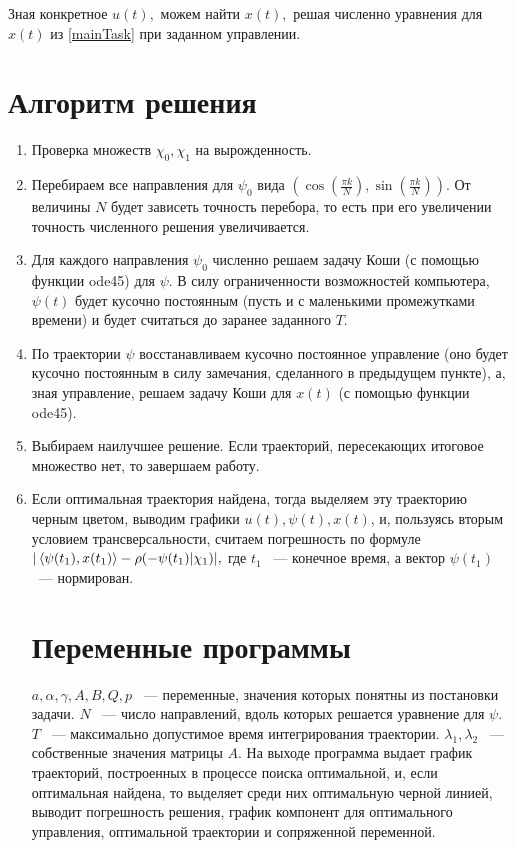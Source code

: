 \documentclass[11pt]{article}
\begin{document}
Зная конкретное $u(t),$ можем найти $x(t),$ решая численно уравнения для $x(t)$ из \eqref{mainTask} при заданном управлении.
\section{Алгоритм решения}
\begin{enumerate}
\item Проверка множеств $\chi_0, \chi_1$ на вырожденность.
\item Перебираем все направления для \(\psi_0\) вида 
\(  \left(\cos\left(\frac{\pi k}{N}\right) , \sin\left(\frac{\pi k}{N}  \right)   \right)  .\) От величины $N$ будет
зависеть точность перебора, то есть при его увеличении точность численного решения увеличивается.
\item Для каждого направления \(\psi_0\) численно решаем задачу Коши (с помощью функции ode45) для $\psi.$
В силу ограниченности возможностей компьютера, $\psi(t)$ будет кусочно постоянным (пусть и с маленькими промежутками времени)
и будет считаться до заранее заданного $T.$
\item По траектории $\psi$ восстанавливаем кусочно постоянное управление (оно будет кусочно постоянным в силу замечания, сделанного в предыдущем пункте), 
а, зная управление, решаем задачу Коши для $x(t)$ (с помощью функции ode45).
\item Выбираем наилучшее решение. Если траекторий, пересекающих итоговое множество нет, то завершаем работу.
\item Если оптимальная траектория найдена, тогда выделяем эту траекторию черным цветом, выводим графики $u(t), \psi(t), x(t)$, и,
 пользуясь вторым условием трансверсальности, считаем погрешность по формуле
$| \left<\psi(t_1),x(t_1)\right> - \rho(-\psi(t_1) | \chi_1) |,$ где $t_1 $ ~--- конечное время, а вектор $\psi(t_1) $ ~--- нормирован.

\section{Переменные программы}
\(a, \alpha, \gamma, A, B, Q, p\) ~--- переменные, значения которых понятны из постановки задачи.
\(N\) ~--- число направлений, вдоль которых решается уравнение для $\psi.$
$T$ ~--- максимально допустимое время интегрирования траектории.
$\lambda_1, \lambda_2$ ~--- собственные значения матрицы $A.$
На выходе программа выдает график траекторий, построенных в процессе поиска оптимальной, и, 
если оптимальная найдена, то выделяет среди них оптимальную черной линией, выводит погрешность
решения, график компонент для оптимального управления, оптимальной траектории и сопряженной переменной.

\end{enumerate}
\end{document}
